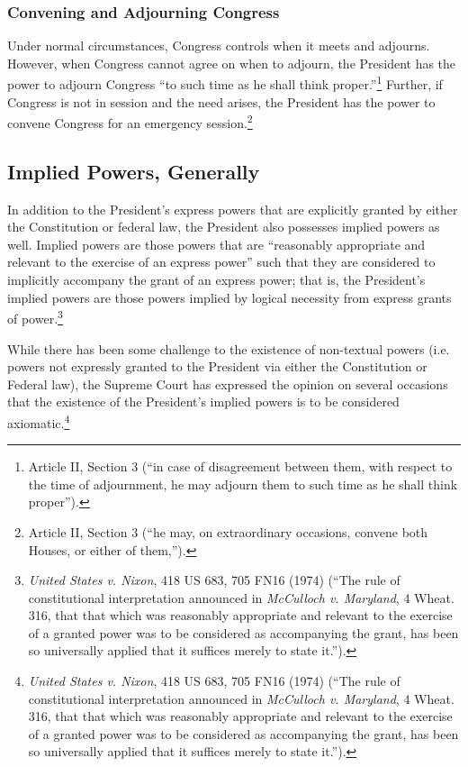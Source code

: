 \subsubsection{Convening and Adjourning Congress}
Under normal circumstances, Congress controls when it meets and adjourns.  
However, when Congress cannot agree on when to adjourn, the President has the power to adjourn Congress ``to such time as he shall think proper.''\footnote{Article II, Section 3 (``in case of disagreement between them, with respect to the time of adjournment, he may adjourn them to such time as he shall think proper'').}
Further, if Congress is not in session and the need arises, the President has the power to convene Congress for an emergency session.\footnote{Article II, Section 3 (``he may, on extraordinary occasions, convene both Houses, or either of them,'').}

\subsection{Implied Powers, Generally}
In addition to the President's express powers that are explicitly granted by either the Constitution or federal law, the President also possesses implied powers as well.  Implied powers are those powers that are ``reasonably appropriate and relevant to the exercise of an express power'' such that they are considered to implicitly accompany the grant of an express power; that is, the President's implied powers are those powers implied by logical necessity from express grants of power.\footnote{\textit{United States v. Nixon}, 418 US 683, 705 FN16 (1974) (``The rule of constitutional interpretation announced in \textit{McCulloch v. Maryland}, 4 Wheat. 316, that that which was reasonably appropriate and relevant to the exercise of a granted power was to be considered as accompanying the grant, has been so universally applied that it suffices merely to state it.'').}


While there has been some challenge to the existence of non-textual powers (i.e. powers not expressly granted to the President via either the Constitution or Federal law), the Supreme Court has expressed the opinion on several occasions that the existence of the President's implied powers is to be considered axiomatic.\footnote{\textit{United States v. Nixon}, 418 US 683, 705 FN16 (1974) (``The rule of constitutional interpretation announced in \textit{McCulloch v. Maryland}, 4 Wheat. 316, that that which was reasonably appropriate and relevant to the exercise of a granted power was to be considered as accompanying the grant, has been so universally applied that it suffices merely to state it.'').}

